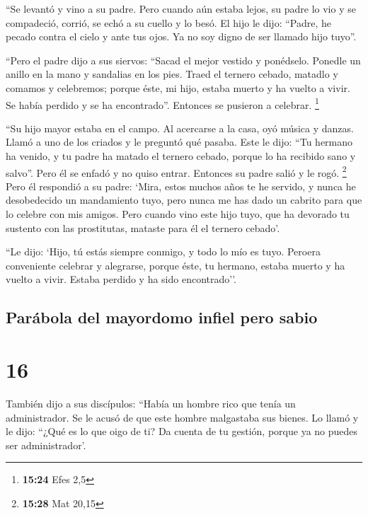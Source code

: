  ``Se levantó y vino a su padre. Pero cuando aún estaba
lejos, su padre lo vio y se compadeció, corrió, se echó a su cuello y lo
besó.  El hijo le dijo: ``Padre, he pecado contra el
cielo y ante tus ojos. Ya no soy digno de ser llamado hijo tuyo''.

 ``Pero el padre dijo a sus siervos: ``Sacad el mejor
vestido y ponédselo. Ponedle un anillo en la mano y sandalias en los
pies.  Traed el ternero cebado, matadlo y comamos y
celebremos;  porque éste, mi hijo, estaba muerto y ha
vuelto a vivir. Se había perdido y se ha encontrado''. Entonces se
pusieron a celebrar. \footnote{\textbf{15:24} Efes 2,5}

 ``Su hijo mayor estaba en el campo. Al acercarse a la
casa, oyó música y danzas.  Llamó a uno de los criados y
le preguntó qué pasaba.  Este le dijo: ``Tu hermano ha
venido, y tu padre ha matado el ternero cebado, porque lo ha recibido
sano y salvo''.  Pero él se enfadó y no quiso entrar.
Entonces su padre salió y le rogó. \footnote{\textbf{15:28} Mat 20,15}
 Pero él respondió a su padre: `Mira, estos muchos años
te he servido, y nunca he desobedecido un mandamiento tuyo, pero nunca
me has dado un cabrito para que lo celebre con mis amigos.
 Pero cuando vino este hijo tuyo, que ha devorado tu
sustento con las prostitutas, mataste para él el ternero cebado'.

 ``Le dijo: `Hijo, tú estás siempre conmigo, y todo lo
mío es tuyo.  Peroera conveniente celebrar y alegrarse,
porque éste, tu hermano, estaba muerto y ha vuelto a vivir. Estaba
perdido y ha sido encontrado''.

\hypertarget{paruxe1bola-del-mayordomo-infiel-pero-sabio}{%
\subsection{Parábola del mayordomo infiel pero
sabio}\label{paruxe1bola-del-mayordomo-infiel-pero-sabio}}

\hypertarget{section-15}{%
\section{16}\label{section-15}}

 También dijo a sus discípulos: ``Había un hombre rico que
tenía un administrador. Se le acusó de que este hombre malgastaba sus
bienes.  Lo llamó y le dijo: ``¿Qué es lo que oigo de ti?
Da cuenta de tu gestión, porque ya no puedes ser administrador'.

